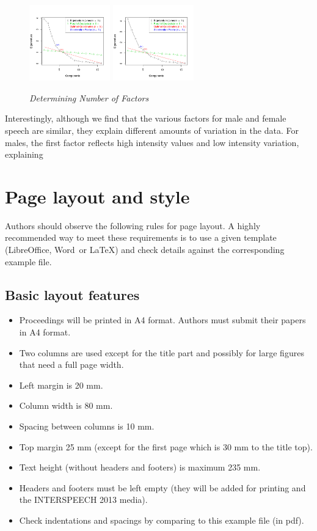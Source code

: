 \documentclass[a4paper]{article}
\def\reg{{\rm\ooalign{\hfil
     \raise.07ex\hbox{\scriptsize R}\hfil\crcr\mathhexbox20D}}}
\begin{document}
\begin{figure}[t]
\includegraphics[width = 3.5cm]{graphics/ScreeFem.png}
\includegraphics[width = 3.5cm]{graphics/ScreeMale.png}
\caption{{\it Determining Number of Factors}}  
\end{figure}

Interestingly, although we find that the various factors for male and female speech are similar, they explain different amounts of variation in the data.  For males, the first factor reflects high intensity values and low intensity variation, explaining   

\section{Page layout and style}

Authors should observe the following rules for page layout. A
highly recommended way to meet these requirements is to use a given
template (LibreOffice, Word\reg\ or \LaTeX) and check details against the
corresponding example file.

\subsection{Basic layout features}

\begin{itemize}
\item Proceedings will be printed in A4 format. Authors must submit their papers
in A4 format.
\item Two columns are used except for the title part and possibly for large 
figures that need a full page width.
\item Left margin is 20 mm.
\item Column width is 80 mm.
\item Spacing between columns is 10 mm.
\item Top margin 25 mm (except for the first page which is 30 mm to the title top).
\item Text height (without headers and footers) is maximum 235 mm.
\item Headers and footers must be left empty (they will be added for 
printing and the INTERSPEECH 2013 media).
\item Check indentations and spacings by comparing to this 
example file (in pdf).
\end{itemize}
\end{document}
